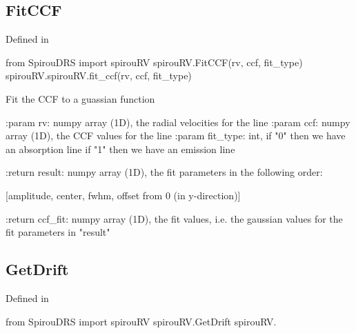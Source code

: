 \begin{minipage}{\textwidth}
\subsection{FitCCF}

Defined in \spirouRV{}

\begin{pythonbox}
from SpirouDRS import spirouRV
spirouRV.FitCCF(rv, ccf, fit_type)
spirouRV.spirouRV.fit_ccf(rv, ccf, fit_type)
\end{pythonbox}

\begin{pythondocstring}
Fit the CCF to a guassian function

:param rv: numpy array (1D), the radial velocities for the line
:param ccf: numpy array (1D), the CCF values for the line
:param fit_type: int, if "0" then we have an absorption line
                      if "1" then we have an emission line

:return result: numpy array (1D), the fit parameters in the
                following order:

            [amplitude, center, fwhm, offset from 0 (in y-direction)]

:return ccf_fit: numpy array (1D), the fit values, i.e. the gaussian values
                 for the fit parameters in "result"
\end{pythondocstring}
\end{minipage}

\begin{minipage}{\textwidth}
\subsection{GetDrift}

Defined in \spirouRV{}

\begin{pythonbox}
from SpirouDRS import spirouRV
spirouRV.GetDrift
spirouRV.
\end{pythonbox}

\begin{pythondocstring}

\end{pythondocstring}
\end{minipage}

